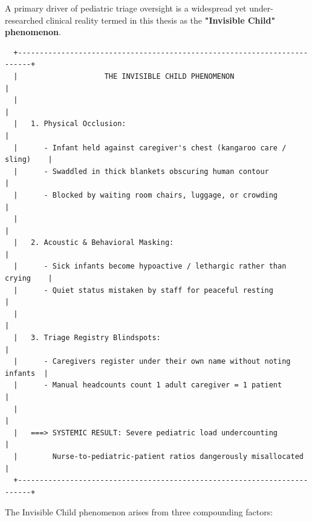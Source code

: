 A primary driver of pediatric triage oversight is a widespread yet under-researched clinical reality termed in this thesis as the \textbf{"Invisible Child" phenomenon}.

\begin{verbatim}
  +-------------------------------------------------------------------------+
  |                    THE INVISIBLE CHILD PHENOMENON                       |
  |                                                                         |
  |   1. Physical Occlusion:                                                |
  |      - Infant held against caregiver's chest (kangaroo care / sling)    |
  |      - Swaddled in thick blankets obscuring human contour               |
  |      - Blocked by waiting room chairs, luggage, or crowding             |
  |                                                                         |
  |   2. Acoustic & Behavioral Masking:                                     |
  |      - Sick infants become hypoactive / lethargic rather than crying    |
  |      - Quiet status mistaken by staff for peaceful resting              |
  |                                                                         |
  |   3. Triage Registry Blindspots:                                        |
  |      - Caregivers register under their own name without noting infants  |
  |      - Manual headcounts count 1 adult caregiver = 1 patient            |
  |                                                                         |
  |   ===> SYSTEMIC RESULT: Severe pediatric load undercounting             |
  |        Nurse-to-pediatric-patient ratios dangerously misallocated       |
  +-------------------------------------------------------------------------+
\end{verbatim}

The Invisible Child phenomenon arises from three compounding factors:

